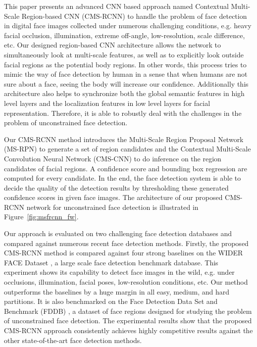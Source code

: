 \documentclass[10pt,journal,cspaper,compsoc]{IEEEtran}
\begin{document}
This paper presents an advanced CNN based approach named Contextual Multi-Scale Region-based CNN (CMS-RCNN) to handle the problem of face detection in digital face images collected under numerous challenging conditions, e.g. heavy facial occlusion, illumination, extreme off-angle, low-resolution, scale difference, etc. Our designed region-based CNN architecture allows the network to simultaneously look at multi-scale features, as well as to explicitly look outside facial regions as the potential body regions. In other words, this process tries to mimic the way of face detection by human in a sense that when humans are not sure about a face, seeing the body will increase our confidence. Additionally this architecture also helps to synchronize both the global semantic features in high level layers and the localization features in low level layers for facial representation.
Therefore, it is able to robustly deal with the challenges in the problem of unconstrained face detection.

Our CMS-RCNN method introduces the Multi-Scale Region Proposal Network (MS-RPN) to generate a set of region candidates and the Contextual Multi-Scale Convolution Neural Network (CMS-CNN) to do inference on the region candidates of facial regions. A confidence score and bounding box regression are computed for every candidate.
In the end, the face detection system is able to decide the quality of the detection results by thresholding these generated confidence scores in given face images.
The architecture of our proposed CMS-RCNN network for unconstrained face detection is illustrated in Figure~\ref{fig:msfrcnn_fw}.

Our approach is evaluated on two challenging face detection databases and compared against numerous recent face detection methods. Firstly, the proposed CMS-RCNN method is compared against four strong baselines \cite{yang2014acf-multiscale,yang2015faceness,yang2016wider} on the WIDER FACE Dataset \cite{yang2016wider}, a large scale face detection benchmark database. This experiment shows its capability to detect face images in the wild, e.g. under occlusions, illumination, facial poses, low-resolution conditions, etc. Our method outperforms the baselines by a huge margin in all easy, medium, and hard partitions.
It is also benchmarked on the Face Detection Data Set and Benchmark (FDDB) \cite{fddbTech}, a dataset of face regions designed for studying the problem of unconstrained face detection.
The experimental results show that the proposed CMS-RCNN approach consistently achieves highly competitive results against the other state-of-the-art face detection methods. 
\end{document}
